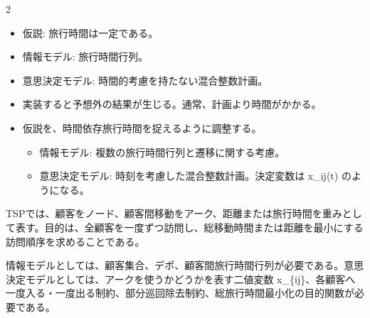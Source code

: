 \clearpage
{}
\begin{multicols}{2}\footnotesize\raggedcolumns
{}
\begin{itemize}
\item 仮説: 旅行時間は一定である。
\item 情報モデル: 旅行時間行列。
\item 意思決定モデル: 時間的考慮を持たない混合整数計画。
\item 実装すると予想外の結果が生じる。通常、計画より時間がかかる。
\item 仮説を、時間依存旅行時間を捉えるように調整する。
\begin{itemize}
\item 情報モデル: 複数の旅行時間行列と遷移に関する考慮。
\item 意思決定モデル: 時刻を考慮した混合整数計画。決定変数は x\_ij(t) のようになる。
\end{itemize}
\end{itemize}
TSPでは、顧客をノード、顧客間移動をアーク、距離または旅行時間を重みとして表す。目的は、全顧客を一度ずつ訪問し、総移動時間または距離を最小にする訪問順序を求めることである。\par

情報モデルとしては、顧客集合、デポ、顧客間旅行時間行列が必要である。意思決定モデルとしては、アークを使うかどうかを表す二値変数 x\_\{ij\}、各顧客へ一度入る・一度出る制約、部分巡回除去制約、総旅行時間最小化の目的関数が必要である。\par


\end{multicols}
